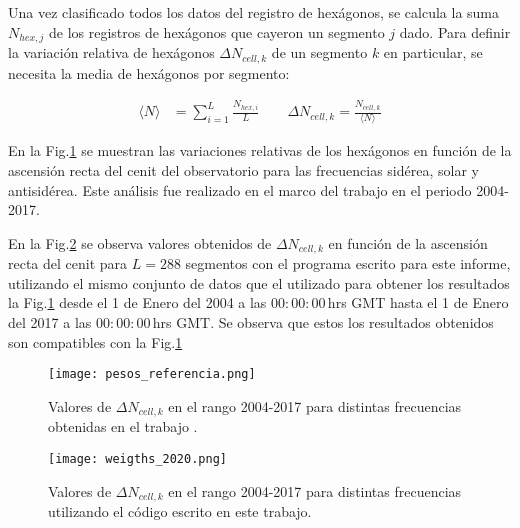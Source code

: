         Una vez clasificado todos los datos del registro de hexágonos, se calcula la suma  $N_{hex, j}$ de los registros de hexágonos que cayeron un segmento $j$ dado. Para definir la variación relativa de hexágonos  $\Delta N_{cell,k}$ de un segmento $k$ en particular, se necesita la media de hexágonos por segmento:
       
       \begin{align}
         \langle N \rangle &= \sum^{L}_{i=1} \frac{N_{hex, i}}{L}  \qquad
         \Delta N_{cell,k} = \frac{N_{cell, k}}{\langle N \rangle}  \label{epepe}
       \end{align}
      
         

      En la Fig.\ref{fig:pesos_referencia} se muestran las variaciones relativas de los hexágonos en función de la ascensión recta del cenit del observatorio para las frecuencias sidérea, solar y antisidérea. Este análisis fue realizado en el marco del trabajo \cite{referencia_pesos} en el periodo 2004-2017. 

       En la Fig.\ref{fig:pesos_ejemplo} se observa valores obtenidos de $\Delta N_{cell,k}$ en función de la ascensión recta del cenit  para $L=288$ segmentos con el programa escrito para este informe, utilizando el mismo conjunto de datos que el utilizado para obtener los resultados la Fig.\ref{fig:pesos_referencia} desde el 1 de Enero del 2004 a las $00:00:00\,$hrs GMT  hasta el 1 de Enero del 2017 a las $00:00:00\,$hrs GMT. Se  observa que estos los resultados obtenidos son compatibles con la Fig.\ref{fig:pesos_referencia}
 
    \begin{figure}[H]
          \centering
              \texttt{[image: pesos\_referencia.png]}  
              \caption{Valores de $\Delta N_{cell, k}$ en el rango 2004-2017 para distintas frecuencias obtenidas en el trabajo \cite{referencia_pesos}.}
              \label{fig:pesos_referencia}
        \end{figure}
       \begin{figure}[H]
          \centering
              \texttt{[image: weigths\_2020.png]}
              \caption{Valores de $\Delta N_{cell, k}$ en el rango 2004-2017 para distintas frecuencias utilizando el código escrito en este trabajo.}
              \label{fig:pesos_ejemplo}
        \end{figure}


